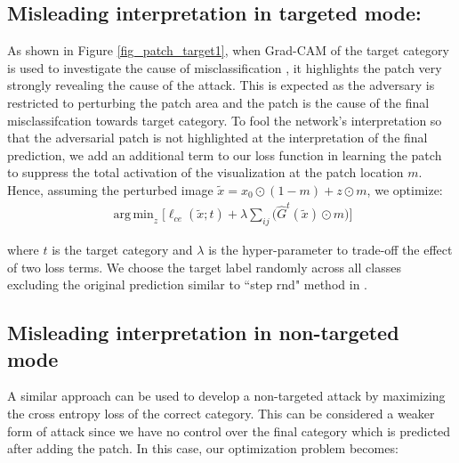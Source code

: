 \documentclass[10pt,twocolumn,letterpaper]{article}
\DeclareMathOperator*{\argmin}{arg\,min}
\begin{document}
\subsection{Misleading interpretation in targeted mode:}
\label{sec:target}
As shown in Figure \ref{fig_patch_target1}, when Grad-CAM of the target category is used to investigate the cause of misclassification  , it highlights the patch very strongly revealing the cause of the attack. This is expected as the adversary is restricted to perturbing the patch area and the patch is the cause of the final misclassifcation towards target category. %
To fool the network's interpretation so that the adversarial patch  is not highlighted at the interpretation of the final prediction, we add an additional term to our loss function in learning the patch to suppress the total activation of the visualization at the patch location $m$. Hence, assuming the perturbed image $\tilde x = x_0 \odot (1-m)+z \odot m$, we optimize:
\begin{equation}
\begin{split}
     \argmin_{z}\Big[\ell_{ce}(\tilde x; t) + \lambda \sum_{ij} \big(\hat{G}^t(\tilde x) \odot m\big)\Big ]
\end{split}
\end{equation}

\noindent where $t$ is the target category and $\lambda$ is the hyper-parameter to trade-off the effect of two loss terms. We choose the target label randomly across all classes excluding the original prediction similar to  ``step rnd" method in \cite{atscale-arxiv-2016}.
\subsection{Misleading interpretation in non-targeted mode}

A similar approach can be used to develop a non-targeted attack by maximizing the cross entropy loss of the correct category. This can be considered a weaker form of attack since we have no control over the final category which is predicted after adding the patch. In this case, our optimization problem becomes:
\end{document}
